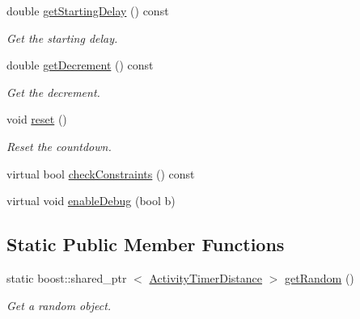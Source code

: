 \begin{DoxyCompactItemize}
double \hyperlink{classcryomesh_1_1components_1_1ActivityTimerDistance_a7da9fc6bc83657837f90ad3a6158e3a5}{get\-Starting\-Delay} () const 
\begin{DoxyCompactList}\small\item\em \-Get the starting delay. \end{DoxyCompactList}\item 
double \hyperlink{classcryomesh_1_1components_1_1ActivityTimerDistance_a3691132699928dc9f7089576ad0c12ce}{get\-Decrement} () const 
\begin{DoxyCompactList}\small\item\em \-Get the decrement. \end{DoxyCompactList}\item 
void \hyperlink{classcryomesh_1_1components_1_1ActivityTimerDistance_aca048029f8ff311c7e215bb2d7689c7b}{reset} ()
\begin{DoxyCompactList}\small\item\em \-Reset the countdown. \end{DoxyCompactList}\item 
virtual bool \hyperlink{classcryomesh_1_1components_1_1ActivityTimerDistance_a2e2ac1b8bc8d942346c1a758d7602a99}{check\-Constraints} () const 
\item 
virtual void \hyperlink{classcryomesh_1_1components_1_1ActivityTimerDistance_a54d73b877fd99ece736c7352a09688ad}{enable\-Debug} (bool b)
\end{DoxyCompactItemize}
\subsection*{\-Static \-Public \-Member \-Functions}
\begin{DoxyCompactItemize}
\item 
static boost\-::shared\-\_\-ptr\*
$<$ \hyperlink{classcryomesh_1_1components_1_1ActivityTimerDistance}{\-Activity\-Timer\-Distance} $>$ \hyperlink{classcryomesh_1_1components_1_1ActivityTimerDistance_ad82f62afe5a34af54ff4c4ec8d1c2344}{get\-Random} ()
\begin{DoxyCompactList}\small\item\em \-Get a random object. \end{DoxyCompactList}\end{DoxyCompactItemize}
